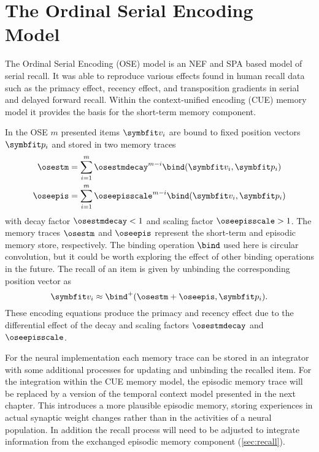 \chapter{The Ordinal Serial Encoding Model}
The Ordinal Serial Encoding (OSE) model \parencite{Choo2010} is an NEF and SPA based model of serial recall.
It was able to reproduce various effects found in human recall data such as the primacy effect, recency effect, and transposition gradients in serial and delayed forward recall.
Within the context-unified encoding (CUE) memory model it provides the basis for the short-term memory component.

In the OSE $m$ presented items $\vc v_i$ are bound to fixed position vectors $\vc p_i$ and stored in two memory traces
\begin{align}
    \osestm &= \sum_{i=1}^m \osestmdecay^{m - i} \bind(\vc v_i, \vc p_i) \\
    \oseepis &= \sum_{i=1}^m \oseepisscale^{m - i} \bind(\vc v_i, \vc p_i)
\end{align}
with decay factor $\osestmdecay < 1$ and scaling factor $\oseepisscale > 1$.
The memory traces $\osestm$ and $\oseepis$ represent the short-term and episodic memory store, respectively.
The binding operation $\bind$ used here is circular convolution, but it could be worth exploring the effect of other binding operations in the future.
The recall of an item is given by unbinding the corresponding position vector as
\begin{equation}
    \vc v_i \approx \bind^+(\osestm + \oseepis, \vc p_i) \text{.}
\end{equation}
These encoding equations produce the primacy and recency effect due to the differential effect of the decay and scaling factors $\osestmdecay$ and $\oseepisscale$.

For the neural implementation each memory trace can be stored in an integrator with some additional processes for updating and unbinding the recalled item.
For the integration within the CUE memory model, the episodic memory trace will be replaced by a version of the temporal context model presented in the next chapter.
This introduces a more plausible episodic memory, storing experiences in actual synaptic weight changes rather than in the activities of a neural population.
In addition the recall process will need to be adjusted to integrate information from the exchanged episodic memory component (\cref{sec:recall}).


